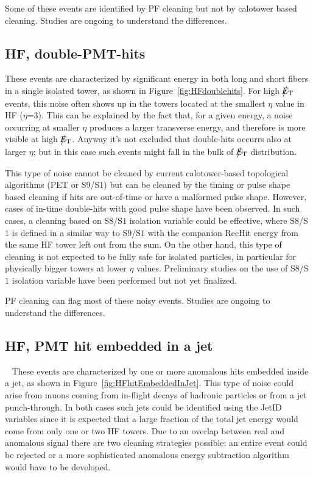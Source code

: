 Some of these events are identified by PF cleaning but not by calotower based cleaning.
Studies are ongoing to understand the differences.

\subsection{HF, double-PMT-hits}
These events are characterized by significant energy in both long and short fibers in a single
isolated tower, as shown in Figure~\ref{fig:HFdoublehits}. For high $\big\slash\hspace{-1.6ex}{E_\text{T}}$ events, 
this noise often shows up in the towers located at the smallest $\eta$ 
value in HF ($\eta$=3). This can be explained by the fact that, for a given energy, 
a noise occurring at smaller $\eta$ produces a larger transverse energy, and therefore is more visible at high $\big\slash\hspace{-1.6ex}{E_\text{T}}$.
Anyway it's not excluded that double-hits occurrs also at larger $\eta$; but in this case such events might 
fall in the bulk of $\big\slash\hspace{-1.6ex}{E_\text{T}}$ distribution.

This type of noise cannot be cleaned by current calotower-based topological algorithms (PET or S9/S1) but can
be cleaned by the timing or pulse shape based cleaning if hits are out-of-time or have a malformed pulse shape.
However, cases of in-time double-hits with good pulse shape have been observed. In such cases, a cleaning based on
S$8$/S$1$ isolation variable could be effective, where S$8$/S$1$ is defined in a similar way to S$9$/S$1$
with the companion RecHit energy from the same HF tower left out from the sum. 
On the other hand, this type of cleaning is not expected to be fully safe for isolated particles, 
in particular for physically bigger towers at lower $\eta$ values. 
Preliminary studies on the use of S$8$/S$1$ isolation variable have been performed but not yet finalized. 

PF cleaning can flag most of these noisy events. Studies are ongoing to understand the differences.

\subsection{HF, PMT hit embedded in a jet} ~\label{sec:HFHitEmbeddedInJet}
These events are characterized by one or more anomalous hits embedded inside a jet, as shown in 
Figure~\ref{fig:HFhitEmbeddedInJet}. This type of noise could arise from muons coming from 
in-flight decays of hadronic particles or from a jet punch-through. In both cases
such jets could be identified using the JetID variables since it is expected that a large fraction of the
total jet energy would come from only one or two HF towers. Due to an overlap between real and anomalous signal there are
two cleaning strategies possible: an entire event could be rejected or a more sophisticated anomalous energy
subtraction algorithm would have to be developed.


